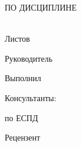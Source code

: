 \begin{ESKDtitlePage}
    \begin{center}
        \courseworkMinEdu \\
        \courseworkEdu \\
        \courseworkKaf \\
    \end{center}

    \vfill

    \begin{center}
        \courseworkTopic \\
    \end{center}

    \vfill

    \begin{center}
        \textbf{\courseworkDocTopic} \\
        ПО ДИСЦИПЛИНЕ \courseworkDiscipline \\
    \end{center}

    \vfill

    \begin{center}
        \courseworkCode \\
        Листов \pageref{LastPage} \\
    \end{center}

    \vfill

    \begin{flushright}
        \begin{minipage}[t]{.49\textwidth}
            \begin{minipage}[t]{.75\textwidth}
                \begin{flushright}
                    Руководитель

                    \hspace{0pt}

                    Выполнил

                    \hspace{0pt}

                    Консультанты:

                    по ЕСПД

                    Рецензент
                \end{flushright}
            \end{minipage}
        \end{minipage}
        \begin{minipage}[t]{.49\textwidth}
            \begin{flushright}
                \begin{minipage}[t]{.75\textwidth}
                    \courseworkTeacherName~\courseworkTeacherSurname


\end{minipage}
\end{flushright}
\end{minipage}
\end{flushright}
\end{ESKDtitlePage}
